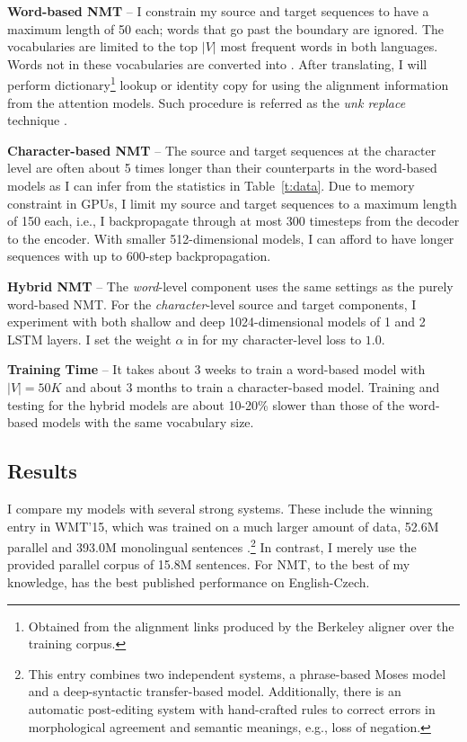 {\bf Word-based NMT} -- I constrain my source and target sequences to
have a maximum length of 50 each; words that go past the boundary are ignored.
The vocabularies are limited to the top $|V|$ most %
frequent words in both languages. Words not in these vocabularies
are converted into \unk{}. After translating, I will perform
dictionary\footnote{Obtained from the alignment links produced by the Berkeley
aligner \cite{liang06alignment} over
the training corpus.} lookup or
identity copy for \unk{} using the alignment information from the
attention models. Such procedure is referred as the {\it unk replace}
technique \cite{luong15,jean15}.

{\bf Character-based NMT} -- The source and
target sequences at the character level are often about 5 times longer than their counterparts in the
word-based models as I can infer from the statistics in
Table~\ref{t:data}. Due to memory constraint in GPUs, I limit my source and
target sequences to a maximum length of 150 each, i.e., I backpropagate
through at most 300 timesteps from the decoder to the encoder. With
smaller 512-dimensional models, I can afford to have longer sequences with up
to 600-step backpropagation. 

{\bf Hybrid NMT} -- The {\it word}-level component uses the
same settings as the purely word-based NMT. For the {\it character}-level source
and target components, I experiment with both shallow and deep 1024-dimensional models of
1 and 2 LSTM layers. 
I
set the weight $\alpha$ in  for my character-level loss to
$1.0$.

{\bf Training Time} -- It takes about 3 weeks to train a word-based model with
$|V|=50K$ and about 3 months to train a character-based model. Training and
testing for the hybrid models are about 10-20\% slower than those of the word-based
models with the same vocabulary size.

\subsection{Results}

I compare my models with several strong systems. These include the
winning entry in WMT'15, which was
trained on a much larger amount of data, 52.6M parallel
 and 393.0M monolingual sentences \cite{bojar15wmt}.\footnote{This
entry combines two independent
systems, a phrase-based Moses model and a deep-syntactic transfer-based model.
Additionally, there is  an automatic
post-editing system with hand-crafted rules to correct errors
in morphological agreement and semantic meanings, e.g., loss of negation.}
In contrast, I merely use the
provided parallel corpus of 15.8M sentences. %
For NMT, to the best of my knowledge, \cite{jean15wmt} has
the best published performance on English-Czech.

